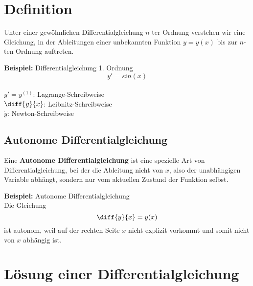 \documentclass[10pt,a4paper]{article}
\begin{document}
\twocolumn
\pagestyle{fancy}

\section{Definition}
\begin{Definitionsbox}
  Unter einer gewöhnlichen Differentialgleichung $n$-ter Ordnung verstehen wir eine Gleichung, in der Ableitungen einer unbekannten Funktion $y = y(x)$ bis zur $n$-ten Ordnung auftreten.
\end{Definitionsbox}
\begin{mdframed}
  \textbf{Beispiel:} Differentialgleichung 1. Ordnung
  \begin{equation*}
    y' = sin(x)
  \end{equation*}
  \\[10pt]
$y' = y^{(1)}$: Lagrange-Schreibweise\\[5pt]
$\diff{y}{x}$: Leibnitz-Schreibweise\\[5pt]
$\dot{y}$: Newton-Schreibweise
\end{mdframed}

\subsection{Autonome Differentialgleichung}
\begin{Definitionsbox}
  Eine \textbf{Autonome Differentialgleichung} ist eine spezielle Art von Differentialgleichung, bei der die Ableitung nicht von $x$, also der unabhängigen Variable abhängt, sondern nur vom aktuellen Zustand der Funktion selbst.
\end{Definitionsbox}
\begin{mdframed}
  \textbf{Beispiel:} Autonome Differentialgleichung\\
  Die Gleichung
  \begin{equation*}
    \diff{y}{x} = y(x)
  \end{equation*}
  ist autonom, weil auf der rechten Seite $x$ nicht explizit vorkommt und somit nicht von $x$ abhängig ist.
\end{mdframed}

\section{Lösung einer Differentialgleichung}
\end{document}
